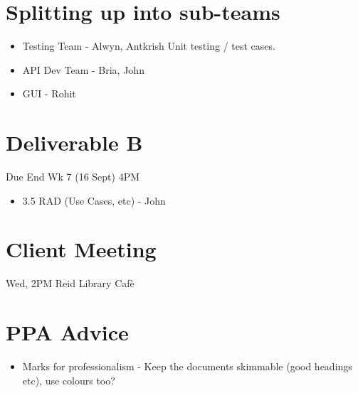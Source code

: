 
\absent{-}
\apologies{-}
\date{29th August, 2011}


\maketitle


\section{Splitting up into sub-teams}
\begin{itemize}
 \item{Testing Team - Alwyn, Antkrish}
 Unit testing / test cases.
 \item{API Dev Team - Bria, John}
 \item{GUI - Rohit}
\end{itemize}

\section{Deliverable B}
Due End Wk 7 (16 Sept) 4PM
\begin{itemize}
 \item 3.5 RAD (Use Cases, etc) - John
\end{itemize}

\section{Client Meeting}
Wed, 2PM Reid Library Caf\`e

\section{PPA Advice}
\begin{itemize}
 \item{Marks for professionalism} - Keep the documents skimmable (good headings etc), use colours too?
\end{itemize}



